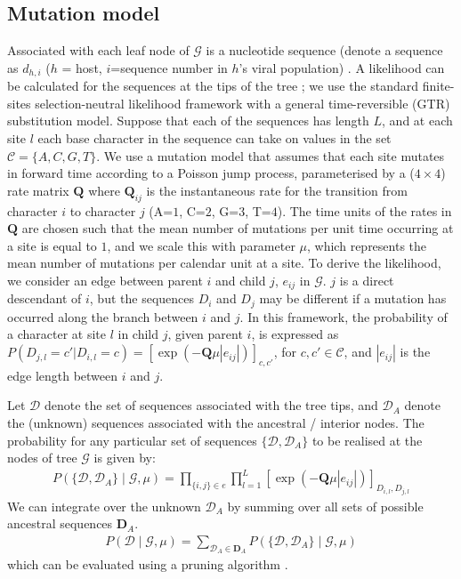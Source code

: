 \documentclass[a4paper,18pt]{report}
\begin{document}
\subsection{Mutation model}
Associated with each leaf node of $\mathcal{G}$ is a nucleotide sequence (denote a sequence as $d_{h,i}$ ($h$ = host, $i$=sequence number in $h$'s viral population) . A likelihood can be calculated for the sequences at the tips of the tree ; we use the standard finite-sites selection-neutral likelihood framework with a general time-reversible (GTR) substitution model. Suppose that each of the sequences has length $L$, and at each site $l$ each base character in the sequence can take on values in the set $\mathcal{C}=\{A,C,G,T\}$. We use a mutation model that assumes that each site mutates in forward time according to a Poisson jump process, parameterised by a ($4 \times 4$) rate matrix $\mathbf{Q}$ where $\mathbf{Q}_{ij}$ is the instantaneous rate for the transition from character $i$ to character $j$ (A=$1$, C=$2$, G=$3$, T=$4$). The time units of the rates in $\mathbf{Q}$ are chosen such that the mean number of mutations per unit time occurring at a site is equal to $1$, and we scale this with parameter $\mu$, which represents the mean number of mutations per calendar unit at a site. 
To derive the likelihood, we consider an edge between parent $i$ and child $j$, $e_{ij}$ in $\mathcal{G}$. $j$ is a direct descendant of $i$, but the sequences $D_i$ and $D_j$ may be different if a mutation has occurred along the branch between $i$ and $j$. In this framework, the probability of a character at site $l$ in child $j$, given parent $i$, is expressed as $P(D_{j,l} = c' | D_{i,l} = c)=[\exp(-\mathbf{Q}\mu|e_{ij}|)]_{c,c'}$, for $c,c' \in \mathcal{C}$, and $|e_{ij}|$ is the edge length between $i$ and $j$. 

Let $\mathcal{D}$ denote the set of sequences associated with the tree tips, and $\mathcal{D}_A$ denote the (unknown) sequences associated with the ancestral / interior nodes. The probability for any particular set of sequences $\{\mathcal{D}, \mathcal{D}_A\}$ to be realised at the nodes of tree $\mathcal{G}$ is given by:
\begin{eqnarray}
P(\{\mathcal{D}, \mathcal{D}_A\}\mid \mathcal{G},\mu)=\prod_{\{i,j\}\in e} \prod_{l=1}^L [\exp(-\mathbf{Q}\mu|e_{ij}|)]_{D_{i,l},D_{j,l}}\label{eq:mut1}
\end{eqnarray}
We can integrate over the unknown $\mathcal{D}_A$ by summing over all sets of possible ancestral sequences $\mathbf{D}_A$.
\begin{eqnarray}
P(\mathcal{D}\mid \mathcal{G},\mu)=\sum_{\mathcal{D}_A \in \mathbf{D}_A} P(\{\mathcal{D}, \mathcal{D}_A\}\mid \mathcal{G},\mu)\label{eq:mut2}
\end{eqnarray}
which can be evaluated using a pruning algorithm \cite{felsenstein:1981}. 
\end{document}
